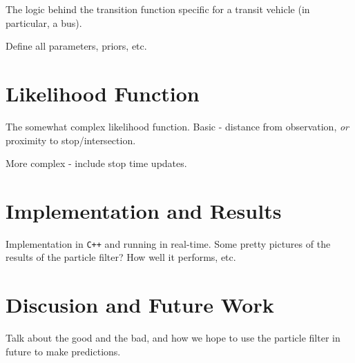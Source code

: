 \documentclass[draft,a4paper,onecolumn]{IEEEtran}\usepackage[]{graphicx}\usepackage[]{color}
\begin{document}
The logic behind the transition function specific for a transit vehicle
(in particular, a bus).

Define all parameters, priors, etc.



\section{Likelihood Function}
\label{sec:likelihood}

The somewhat complex likelihood function.
Basic - distance from observation, \emph{or} proximity to stop/intersection.

More complex - include stop time updates.



\section{Implementation and Results}
\label{sec:results}

Implementation in \texttt{C++} and running in real-time.
Some pretty pictures of the results of the particle filter? 
How well it performs, etc.



\section{Discusion and Future Work}
\label{sec:discussion}

Talk about the good and the bad, and how we hope to use the particle filter in future to make predictions.
\end{document}
